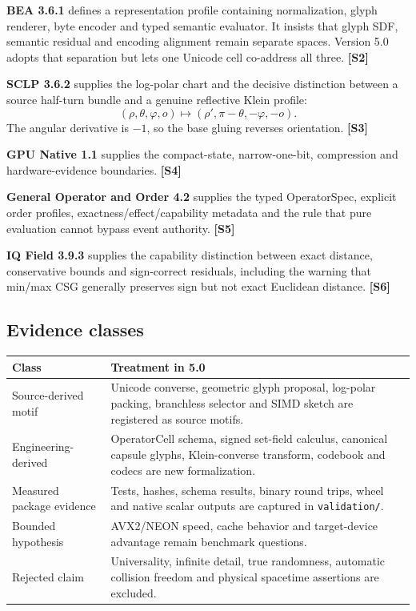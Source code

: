 \documentclass[11pt,a4paper]{article}
\newcommand{\source}[1]{\textcolor{UGTSPurple}{\textbf{[#1]}}}
\begin{document}
\textbf{BEA 3.6.1} defines a representation profile containing normalization, glyph renderer, byte encoder and typed semantic evaluator. It insists that glyph SDF, semantic residual and encoding alignment remain separate spaces. Version 5.0 adopts that separation but lets one Unicode cell co-address all three. \source{S2}

\textbf{SCLP 3.6.2} supplies the log-polar chart and the decisive distinction between a source half-turn bundle and a genuine reflective Klein profile:
\[
(\rho,\theta,\varphi,o)\mapsto(\rho',\pi-\theta,-\varphi,-o).
\]
The angular derivative is \(-1\), so the base gluing reverses orientation. \source{S3}

\textbf{GPU Native 1.1} supplies the compact-state, narrow-one-bit, compression and hardware-evidence boundaries. \source{S4}

\textbf{General Operator and Order 4.2} supplies the typed OperatorSpec, explicit order profiles, exactness/effect/capability metadata and the rule that pure evaluation cannot bypass event authority. \source{S5}

\textbf{IQ Field 3.9.3} supplies the capability distinction between exact distance, conservative bounds and sign-correct residuals, including the warning that min/max CSG generally preserves sign but not exact Euclidean distance. \source{S6}

\subsection{Evidence classes}
\begin{tabularx}{\textwidth}{P{34mm}Y}
\toprule
\textbf{Class} & \textbf{Treatment in 5.0}\\
\midrule
Source-derived motif & Unicode converse, geometric glyph proposal, log-polar packing, branchless selector and SIMD sketch are registered as source motifs.\\
Engineering-derived & OperatorCell schema, signed set-field calculus, canonical capsule glyphs, Klein-converse transform, codebook and codecs are new formalization.\\
Measured package evidence & Tests, hashes, schema results, binary round trips, wheel and native scalar outputs are captured in \texttt{validation/}.\\
Bounded hypothesis & AVX2/NEON speed, cache behavior and target-device advantage remain benchmark questions.\\
Rejected claim & Universality, infinite detail, true randomness, automatic collision freedom and physical spacetime assertions are excluded.\\
\bottomrule
\end{tabularx}
\end{document}
